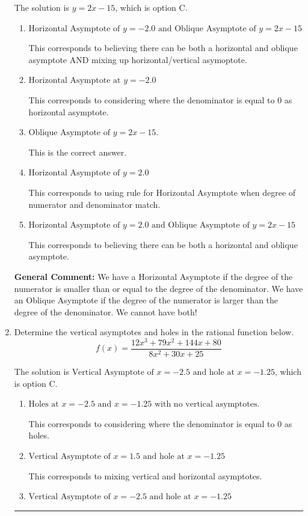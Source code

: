 \documentclass{extbook}[14pt]
\newcommand{\litem}[1]{\item #1

\rule{\textwidth}{0.4pt}}
\begin{document}
\begin{enumerate}
{The solution is \( y = 2x -15 \), which is option C.\begin{enumerate}[label=\Alph*.]
\item \( \text{Horizontal Asymptote of } y = -2.0 \text{ and Oblique Asymptote of } y = 2x -15 \)

This corresponds to believing there can be both a horizontal and oblique asymptote AND mixing up horizontal/vertical asymoptote.
\item \( \text{Horizontal Asymptote at } y = -2.0 \)

This corresponds to considering where the denominator is equal to 0 as horizontal asymptote.
\item \( \text{Oblique Asymptote of } y = 2x -15. \)

This is the correct answer.
\item \( \text{Horizontal Asymptote of } y = 2.0  \)

This corresponds to using rule for Horizontal Asymptote when degree of numerator and denominator match.
\item \( \text{Horizontal Asymptote of } y = 2.0 \text{ and Oblique Asymptote of } y = 2x -15 \)

This corresponds to believing there can be both a horizontal and oblique asymptote.
\end{enumerate}

\textbf{General Comment:} We have a Horizontal Asymptote if the degree of the numerator is smaller than or equal to the degree of the denominator. We have an Oblique Asymptote if the degree of the numerator is larger than the degree of the denominator. We cannot have both!
}
\litem{
Determine the vertical asymptotes and holes in the rational function below.
\[ f(x) = \frac{12x^{3} +79 x^{2} +144 x + 80}{8x^{2} +30 x + 25} \]

The solution is \( \text{Vertical Asymptote of } x = -2.5 \text{ and hole at } x = -1.25 \), which is option C.\begin{enumerate}[label=\Alph*.]
\item \( \text{Holes at } x = -2.5 \text{ and } x = -1.25 \text{ with no vertical asymptotes.} \)

This corresponds to considering where the denominator is equal to 0 as holes.
\item \( \text{Vertical Asymptote of } x = 1.5 \text{ and hole at } x = -1.25 \)

This corresponds to mixing vertical and horizontal asymptotes.
\item \( \text{Vertical Asymptote of } x = -2.5 \text{ and hole at } x = -1.25 \)


\end{enumerate}}
\end{enumerate}
\end{document}
